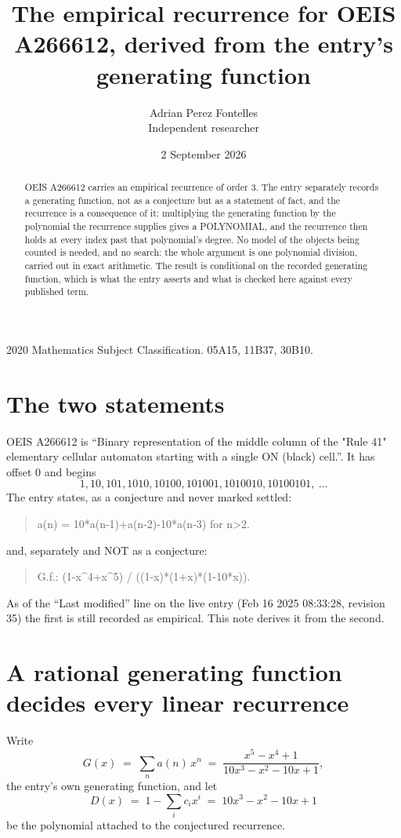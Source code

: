 \documentclass[11pt,a4paper]{article}
\title{The empirical recurrence for OEIS A266612, derived from the entry's generating function}
\author{Adrian Perez Fontelles\\ \small Independent researcher}
\date{2 September 2026}
\theoremstyle{plain}
\theoremstyle{definition}
\begin{document}
\maketitle

\begin{abstract}
OEIS A266612 carries an empirical recurrence of order $3$. The entry separately records a
generating function, not as a conjecture but as a statement of fact, and the recurrence is a
consequence of it: multiplying the generating function by the polynomial the recurrence
supplies gives a POLYNOMIAL, and the recurrence then holds at every index past that
polynomial's degree. No model of the objects being counted is needed, and no search: the
whole argument is one polynomial division, carried out in exact arithmetic. The result is
conditional on the recorded generating function, which is what the entry asserts and what is
checked here against every published term.
\end{abstract}

\noindent\small 2020 Mathematics Subject Classification. 05A15, 11B37, 30B10.\normalsize

\section{The two statements}

OEIS A266612 is ``Binary representation of the middle column of the "Rule 41" elementary cellular automaton starting with a single ON (black) cell.''. It has offset $0$ and begins
\[
1, 10, 101, 1010, 10100, 101001, 1010010, 10100101,\ \dots
\]
The entry states, as a conjecture and never marked settled:
\begin{quote}
a(n) = 10*a(n-1)+a(n-2)-10*a(n-3) for n>2.
\end{quote}
and, separately and NOT as a conjecture:
\begin{quote}
G.f.: (1-x\^{}4+x\^{}5) / ((1-x)*(1+x)*(1-10*x)).
\end{quote}
As of the ``Last modified'' line on the live entry (Feb 16 2025 08:33:28, revision 35) the first is still
recorded as empirical. This note derives it from the second.

\section{A rational generating function decides every linear recurrence}

Write
\[
G(x)\;=\;\sum_{n}a(n)\,x^{n}\;=\;\frac{x^{5} - x^{4} + 1}{10 x^{3} - x^{2} - 10 x + 1},
\]
the entry's own generating function, and let
\[
D(x)\;=\;1-\sum_i c_i x^{i}\;=\;10 x^{3} - x^{2} - 10 x + 1
\]
be the polynomial attached to the conjectured recurrence.
\end{document}
